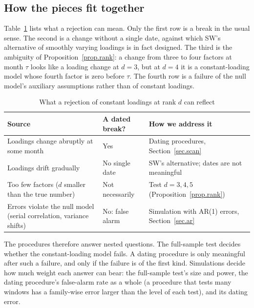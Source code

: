 \documentclass[11pt]{article}
\begin{document}
\subsection{How the pieces fit together}\label{sec.logic}

Table~\ref{tab.logic} lists what a rejection can mean. Only the first row is a break in the usual sense. The second is a change without a single date, against which SW's alternative of smoothly varying loadings is in fact designed. The third is the ambiguity of Proposition~\ref{prop.rank}: a change from three to four factors at month $\tau$ looks like a loading change at $d=3$, but at $d=4$ it is a constant-loading model whose fourth factor is zero before $\tau$. The fourth row is a failure of the null model's auxiliary assumptions rather than of constant loadings.

\begin{table}[htbp]
\centering
\small
\begin{threeparttable}
\caption{What a rejection of constant loadings at rank $d$ can reflect}\label{tab.logic}
\begin{tabular}{p{5.4cm}p{3.2cm}p{5.6cm}}
\toprule
Source & A dated break? & How we address it\\
\midrule
Loadings change abruptly at some month & Yes & Dating procedures, Section~\ref{sec.scan}\\
Loadings drift gradually & No single date & SW's alternative; dates are not meaningful\\
Too few factors ($d$ smaller than the true number) & Not necessarily & Test $d=3,4,5$ (Proposition~\ref{prop.rank})\\
Errors violate the null model (serial correlation, variance shifts) & No: false alarm & Simulation with AR(1) errors, Section~\ref{sec.ar}\\
\bottomrule
\end{tabular}
\end{threeparttable}
\end{table}

The procedures therefore answer nested questions. The full-sample test decides whether the constant-loading model fails. A dating procedure is only meaningful after such a failure, and only if the failure is of the first kind. Simulations decide how much weight each answer can bear: the full-sample test's size and power, the dating procedure's false-alarm rate as a whole (a procedure that tests many windows has a family-wise error larger than the level of each test), and its dating error.
\end{document}
